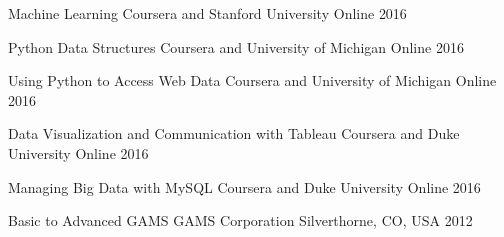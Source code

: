 

\begin{cvhonors}

    \cvhonor
    {Machine Learning} %
    {Coursera and Stanford University} %
    {Online} %
    {2016} %

    \cvhonor
    {Python Data Structures} %
    {Coursera and University of Michigan} %
    {Online} %
    {2016} %

    \cvhonor
    {Using Python to Access Web Data} %
    {Coursera and University of Michigan} %
    {Online} %
    {2016} %

    \cvhonor
    {Data Visualization and Communication with Tableau} %
    {Coursera and Duke University} %
    {Online} %
    {2016} %

    \cvhonor
    {Managing Big Data with MySQL} %
    {Coursera and Duke University} %
    {Online} %
    {2016} %

    \cvhonor
    {Basic to Advanced GAMS} %
    {GAMS Corporation} %
    {Silverthorne, CO, USA} %
    {2012} %

\end{cvhonors}
